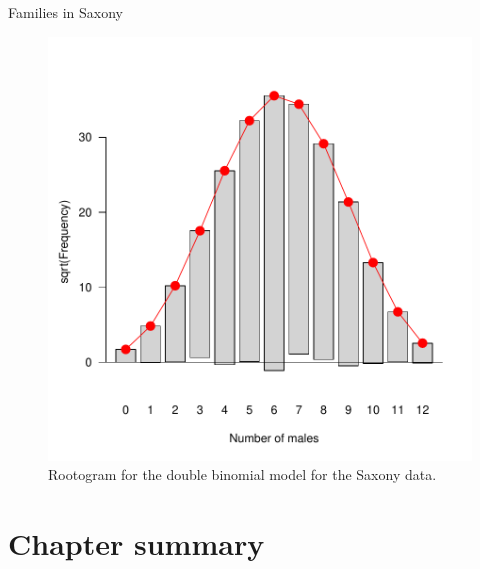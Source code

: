 \documentclass[11pt]{book}\usepackage[]{graphicx}\usepackage[]{color}
\newenvironment{knitrout}{}{} %
\renewenvironment{knitrout}{\small\renewcommand{\baselinestretch}{.85}}{} %
\begin{document}
\begin{Example}[saxony2]{Families in Saxony}
\begin{knitrout}
\begin{figure}[htbp]
\centerline{\includegraphics[width=.6\textwidth]{ch03/fig/sax-glm5} }

\caption[Rootogram for the double binomial model for the Saxony data]{Rootogram for the double binomial model for the Saxony data.\label{fig:sax-glm5}}
\end{figure}


\end{knitrout}




\end{Example}


\section{Chapter summary}\label{sec:ch03-summary}
\end{document}
